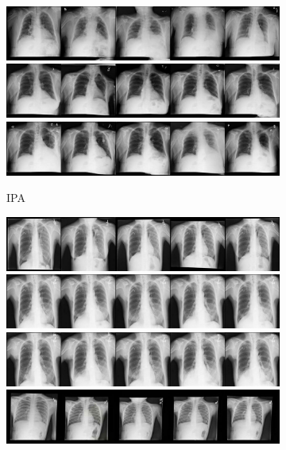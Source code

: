 \begin{figure}[t]
\begin{subfigure}[t]{0.4\textwidth}
    \includegraphics[height=\xrayimgheight]{figs/cigcvae/image-samples/xray/ipa_4.jpg}
    \includegraphics[height=\xrayimgheight]{figs/cigcvae/image-samples/xray/ipa_5.jpg}
    \includegraphics[height=\xrayimgheight]{figs/cigcvae/image-samples/xray/ipa_6.jpg}
    \caption{IPA}
  \end{subfigure}
  \begin{subfigure}[t]{0.4\textwidth}
    \centering
    \includegraphics[height=\xrayimgheight]{figs/cigcvae/image-samples/xray/comodgan_1.jpg}
    \includegraphics[height=\xrayimgheight]{figs/cigcvae/image-samples/xray/comodgan_2.jpg}
    \includegraphics[height=\xrayimgheight]{figs/cigcvae/image-samples/xray/comodgan_3.jpg}
    \includegraphics[height=\xrayimgheight]{figs/cigcvae/image-samples/xray/comodgan_4.jpg}

\end{subfigure}
\end{figure}
